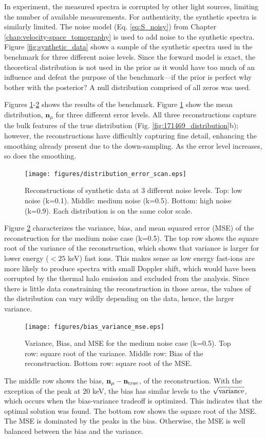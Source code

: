 In experiment, the measured spectra is corrupted by other light sources, limiting the number of available measurements.
For authenticity, the synthetic spectra is similarly limited. The noise model (Eq. \ref{eq:S_noisy}) from Chapter \ref{chap:velocity-space_tomography} is used to add noise to the synthetic spectra. Figure \ref{fig:synthetic_data} shows a sample of the synthetic spectra used in the benchmark for three different noise levels. Since the forward model is exact, the theoretical distribution is not used in the prior as it would have too much of an influence and defeat the purpose of the benchmark---if the prior is perfect why bother with the posterior? A null distribution comprised of all zeros was used.

Figures \ref{fig:synthetic_reconstructions}-\ref{fig:bias_variance_mse} shows the results of the benchmark. Figure \ref{fig:synthetic_reconstructions} show the mean distribution, $\mathbf{n}_\mu$ for three different error levels. All three reconstructions capture the bulk features of the true distribution (Fig. \ref{fig:171469_distribution}b); however, the reconstructions have difficultly capturing fine detail, enhancing the smoothing already present due to the down-sampling. As the error level increases, so does the smoothing. 
\begin{figure}[h!]
    \centering
    \texttt{[image: figures/distribution\_error\_scan.eps]}
    \caption{Reconstructions of synthetic data at 3 different noise levels. Top: low noise (k=0.1). Middle: medium noise (k=0.5). Bottom: high noise (k=0.9). Each distribution is on the same color scale.}
    \label{fig:synthetic_reconstructions}
\end{figure}

Figure \ref{fig:bias_variance_mse} characterizes the variance, bias, and mean squared error (MSE) of the reconstruction for the medium noise case (k=0.5). The top row shows the square root of the variance of the reconstruction, which shows that variance is larger for lower energy ($<25$ keV) fast ions. This makes sense as low energy fast-ions are more likely to produce spectra with small Doppler shift, which would have been corrupted by the thermal halo emission and excluded from the analysis. Since there is little data constraining the reconstruction in those areas, the values of the distribution can vary wildly depending on the data, hence, the larger variance.
\begin{figure}[h!]
    \centering
    \texttt{[image: figures/bias\_variance\_mse.eps]}
    \caption{Variance, Bias, and MSE for the medium noise case (k=0.5). Top row: square root of the variance. Middle row: Bias of the reconstruction. Bottom row: square root of the MSE.}
    \label{fig:bias_variance_mse}
\end{figure}
The middle row shows the bias, $\mathbf{n}_\mu - \mathbf{n}_{\rm{true}}$, of the reconstruction. With the exception of the peak at 20 keV, the bias has similar levels to the $\sqrt{\rm{variance}}$, which occurs when the bias-variance tradeoff is optimized. This indicates that the optimal solution was found. The bottom row shows the square root of the MSE. The MSE is dominated by the peaks in the bias. Otherwise, the MSE is well balanced between the bias and the variance.

